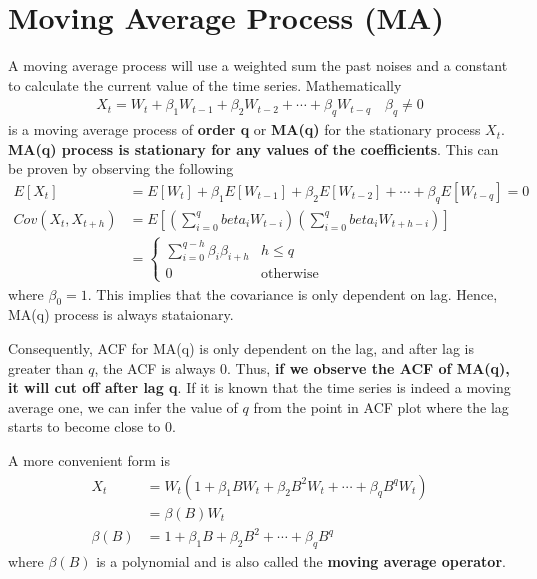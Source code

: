 \documentclass[../../time_series_notes.tex]{subfiles}
\begin{document}
\section{Moving Average Process (MA)}
A moving average process will use a weighted sum the past noises and a constant to calculate the current value of the time series. Mathematically
\begin{align*}
    X_{t} = W_{t} + \beta_{1}W_{t-1} + \beta_{2}W_{t-2} + \cdots + \beta_{q}W_{t-q} \quad \beta_{q} \neq 0
\end{align*}
is a moving average process of \textbf{order q} or \textbf{MA(q)} for the stationary process $X_{t}$. \textbf{MA(q) process is stationary for any values of the coefficients}. This can be proven by observing the following
\begin{align*}
    E[X_{t}] &= E[W_{t}] + \beta_{1}E[W_{t-1}] + \beta_{2}E[W_{t-2}] + \cdots + \beta_{q}E[W_{t-q}] = 0\\
    Cov(X_{t}, X_{t+h}) &= E[(\sum_{i=0}^{q} beta_{i}W_{t-i}) (\sum_{i=0}^{q} beta_{i}W_{t+h-i})]\\
    &= \begin{cases} \sum_{i=0}^{q-h} \beta_{i}\beta_{i+h} &\mbox{$h \leq q$}\\ 0 &\mbox{otherwise} \end{cases}
\end{align*} 
where $\beta_{0} = 1$. This implies that the covariance is only dependent on lag. Hence, MA(q) process is always stataionary.\newline

Consequently, ACF for MA(q) is only dependent on the lag, and after lag is greater than $q$, the ACF is always 0. Thus, \textbf{if we observe the ACF of MA(q), it will cut off after lag q}. If it is known that the time series is indeed a moving average one, we can infer the value of $q$ from the point in ACF plot where the lag starts to become close to 0.\newline 

A more convenient form is
\begin{align*}
    X_{t} &= W_{t}(1 + \beta_{1}BW_{t} + \beta_{2}B^{2}W_{t} + \cdots + \beta_{q}B^{q}W_{t})\\
    &= \beta(B)W_{t}\\
    \beta(B) &= 1 + \beta_{1}B + \beta_{2}B^{2} + \cdots + \beta_{q}B^{q}
\end{align*}
where $\beta(B)$ is a polynomial and is also called the \textbf{moving average operator}.
\end{document}
